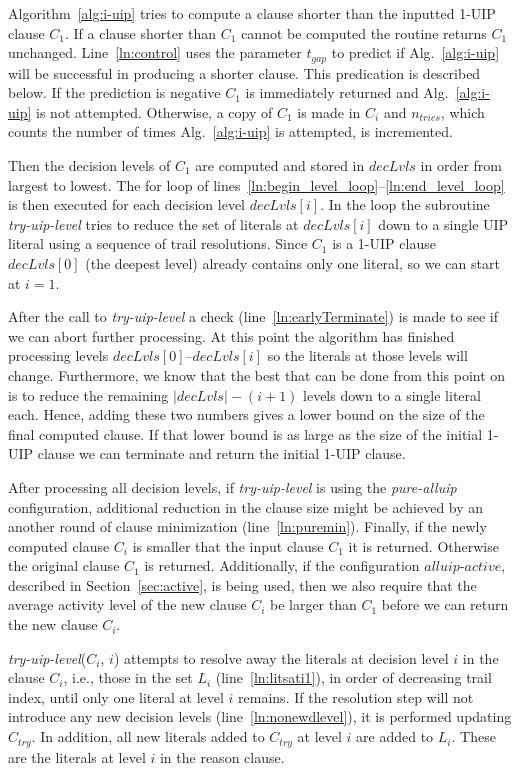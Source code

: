 \documentclass[runningheads]{llncs}
\newcommand{\oneuip}{1-UIP\xspace}
\newcommand{\tgap}{t_{\mathit{gap}}}
\newcommand{\ntries}{n_{\mathit{tries}}}
\newcommand{\tryuiplevel}{\textit{try-uip-level}\xspace}
\newcommand{\allUipPure}{\textit{pure-alluip}\xspace}
\newcommand{\allUipAct}{\textit{alluip-active}}
\newcommand{\dlevels}{\ensuremath{\mathit{decLvls}}}
\newcommand{\ctry}{C_{\mathit{try}}}
\begin{document}
Algorithm~\ref{alg:i-uip} tries to compute a clause shorter than the
inputted \oneuip clause $C_1$. If a clause shorter than $C_1$ cannot
be computed the routine returns $C_1$ unchanged. Line~\ref{ln:control}
uses the parameter $\tgap$ to predict if Alg.~\ref{alg:i-uip} will be
successful in producing a shorter clause. This predication is
described below. If the prediction is negative $C_1$ is immediately
returned and Alg.~\ref{alg:i-uip} is not attempted. Otherwise, a copy
of $C_1$ is made in $C_i$ and $\ntries$, which counts the number of
times Alg.~\ref{alg:i-uip} is attempted, is incremented.

Then the decision levels of $C_1$ are computed and stored in
$\dlevels$ in order from largest to lowest. The for loop of
lines~\ref{ln:begin_level_loop}--\ref{ln:end_level_loop} is then
executed for each decision level $\dlevels[i]$. In the loop the
subroutine \tryuiplevel tries to reduce the set of literals at
$\dlevels[i]$ down to a single UIP literal using a sequence of trail
resolutions. Since $C_1$ is a \oneuip clause $\dlevels[0]$ (the
deepest level) already contains only one literal, so we can start at
$i=1$.

After the call to \tryuiplevel a check (line~\ref{ln:earlyTerminate})
is made to see if we can abort further processing. At this point the
algorithm has finished processing levels $\dlevels[0]$--$\dlevels[i]$
so the literals at those levels will change. Furthermore, we know that
the best that can be done from this point on is to reduce the
remaining $|\dlevels| - (i+1)$ levels down to a single literal
each. Hence, adding these two numbers gives a lower bound on the size
of the final computed clause. If that lower bound is as large as the
size of the initial \oneuip clause we can terminate and return the initial
\oneuip clause.

After processing all decision levels, if \tryuiplevel is using the
\allUipPure configuration, additional reduction in the clause size
might be achieved by an another round of clause minimization
(line~\ref{ln:puremin}). Finally, if the newly computed clause $C_i$
is smaller that the input clause $C_1$ it is returned. Otherwise the
original clause $C_1$ is returned. Additionally, if the configuration
$\allUipAct$, described in Section~\ref{sec:active}, is being used,
then we also require that the average activity level of the new clause
$C_i$ be larger than $C_1$ before we can return the new clause $C_i$.

\tryuiplevel($C_i$, $i$) attempts to resolve away the literals at
decision level $i$ in the clause $C_i$, i.e., those in the set $L_i$
(line~\ref{ln:litsati1}), in order of decreasing trail index, until
only one literal at level $i$ remains. If the resolution step will not
introduce any new decision levels (line~\ref{ln:nonewdlevel}), it is
performed updating $\ctry$. In addition, all new literals added to
$\ctry$ at level $i$ are added to $L_i$. These are the literals at
level $i$ in the reason clause.
\end{document}
